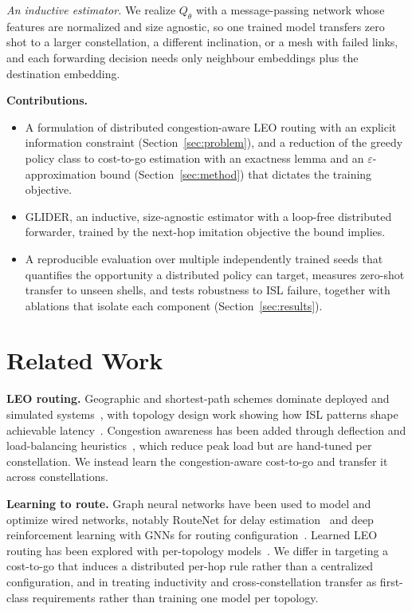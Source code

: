 \documentclass[conference]{IEEEtran}
\begin{document}
\emph{An inductive estimator.} We realize $Q_\theta$ with a message-passing network whose features are normalized and size agnostic, so one trained model transfers zero shot to a larger constellation, a different inclination, or a mesh with failed links, and each forwarding decision needs only neighbour embeddings plus the destination embedding.

\noindent\textbf{Contributions.}
\begin{itemize}
\item A formulation of distributed congestion-aware LEO routing with an explicit information constraint (Section~\ref{sec:problem}), and a reduction of the greedy policy class to cost-to-go estimation with an exactness lemma and an $\varepsilon$-approximation bound (Section~\ref{sec:method}) that dictates the training objective.
\item GLIDER, an inductive, size-agnostic estimator with a loop-free distributed forwarder, trained by the next-hop imitation objective the bound implies.
\item A reproducible evaluation over multiple independently trained seeds that quantifies the opportunity a distributed policy can target, measures zero-shot transfer to unseen shells, and tests robustness to ISL failure, together with ablations that isolate each component (Section~\ref{sec:results}).
\end{itemize}

\section{Related Work}
\textbf{LEO routing.} Geographic and shortest-path schemes dominate deployed and simulated systems~\cite{handley2018delay,kassing2020hypatia,giuliari2020icarus}, with topology design work showing how ISL patterns shape achievable latency~\cite{bhattacherjee2019topology}. Congestion awareness has been added through deflection and load-balancing heuristics~\cite{lozano2022deflection,roth2021survey}, which reduce peak load but are hand-tuned per constellation. We instead learn the congestion-aware cost-to-go and transfer it across constellations.

\textbf{Learning to route.} Graph neural networks have been used to model and optimize wired networks, notably RouteNet for delay estimation~\cite{rusek2020routenet} and deep reinforcement learning with GNNs for routing configuration~\cite{almasan2022drlgnn}. Learned LEO routing has been explored with per-topology models~\cite{markovitz2022deeproute}. We differ in targeting a cost-to-go that induces a distributed per-hop rule rather than a centralized configuration, and in treating inductivity and cross-constellation transfer as first-class requirements rather than training one model per topology.
\end{document}
